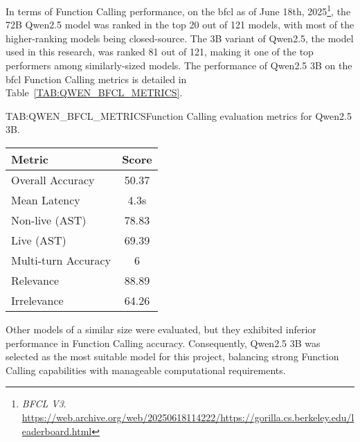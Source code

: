 In terms of Function Calling performance, on the \ac{bfcl} as of June 18th, 2025\footnote[1]{\emph{BFCL V3}. \url{https://web.archive.org/web/20250618114222/https://gorilla.cs.berkeley.edu/leaderboard.html}}, the 72B Qwen2.5 model was ranked in the top 20 out of 121 models, with most of the higher-ranking models being closed-source. The 3B variant of Qwen2.5, the model used in this research, was ranked 81 out of 121, making it one of the top performers among similarly-sized models. The performance of Qwen2.5 3B on the \ac{bfcl} Function Calling metrics is detailed in Table~\ref{TAB:QWEN_BFCL_METRICS}.
\begin{table}[Function Calling Evaluation Metrics for Qwen2.5 3B]{TAB:QWEN_BFCL_METRICS}{Function Calling evaluation metrics for Qwen2.5 3B.}
    \begin{tabular}{l c}
        \hline
        \textbf{Metric} & \textbf{Score} \\
        \hline
        Overall Accuracy & 50.37 \\
        Mean Latency & 4.3s \\
        Non-live (AST) & 78.83 \\
        Live (AST) & 69.39 \\
        Multi-turn Accuracy & 6 \\
        Relevance & 88.89 \\
        Irrelevance & 64.26 \\
        \hline
    \end{tabular}
\end{table}

Other models of a similar size were evaluated, but they exhibited inferior performance in Function Calling accuracy. Consequently, Qwen2.5 3B was selected as the most suitable model for this project, balancing strong Function Calling capabilities with manageable computational requirements.